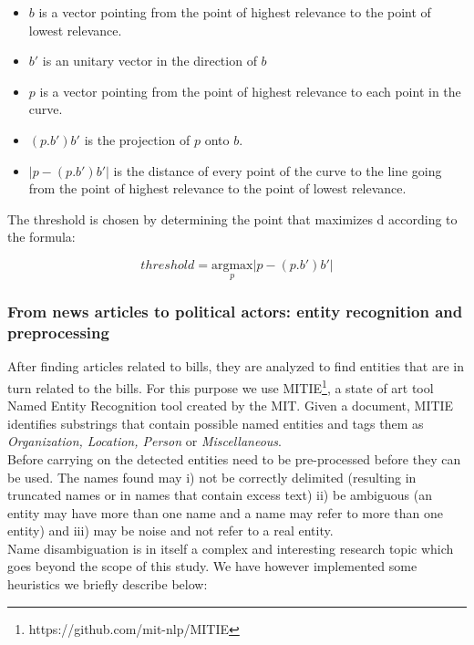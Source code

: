 \begin{itemize}
\item $b$ is a vector pointing from the point of highest relevance to the point of lowest relevance.
\item $b'$ is an unitary vector in the direction of $b$
\item $p$ is a vector pointing from the point of highest relevance to each point in the curve.
\item $(p.b')b'$ is the projection of $p$ onto $b$.
\item $|p - (p.b')b'|$ is the distance of every point of the curve to the line going from the point of highest relevance to the point of lowest relevance.
\end{itemize}

The threshold is chosen by determining the point that maximizes d according to the formula:

$$threshold = \underset{p} {\mathrm{argmax}} |p - (p.b')b'|$$


\subsubsection{From news articles to political actors: entity recognition and preprocessing}\label{subsec:getting-entities}

After finding articles related to bills, they are analyzed to find entities that are in turn related to the bills. For this purpose we use MITIE\footnote{https://github.com/mit-nlp/MITIE}, a state of art tool Named Entity Recognition tool created by the MIT. Given a document, MITIE identifies substrings that contain possible named entities and tags them as \emph{Organization, Location, Person} or \emph{Miscellaneous}.\\

Before carrying on the detected entities need to be pre-processed before they can be used. The names found may i) not be correctly delimited (resulting in truncated names or in names that contain excess text) ii) be ambiguous (an entity may have more than one name and a name may refer to more than one entity) and iii) may be noise and not refer to a real entity. \\

Name disambiguation is in itself a complex and interesting research topic which goes beyond the scope of this study. We have however implemented some heuristics we briefly describe below:\\

